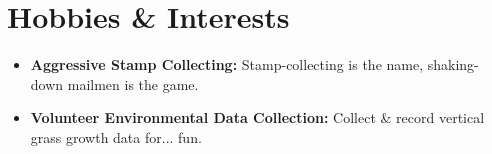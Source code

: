 \documentclass[11pt,a4paper,roman]{moderncv}        %
\begin{document}
\bigskip
\section{Hobbies \& Interests}
\begin{minipage}{\maincolumnwidth}\small{
	\begin{itemize}
        \item \textbf{Aggressive Stamp Collecting:} Stamp-collecting is the name, shaking-down mailmen is the game.
        \vspace{3pt}
		\item \textbf{Volunteer Environmental Data Collection:} Collect \& record vertical grass growth data for... fun.
	\end{itemize}}%
\end{minipage}%

\nocite{*}


\end{document}

